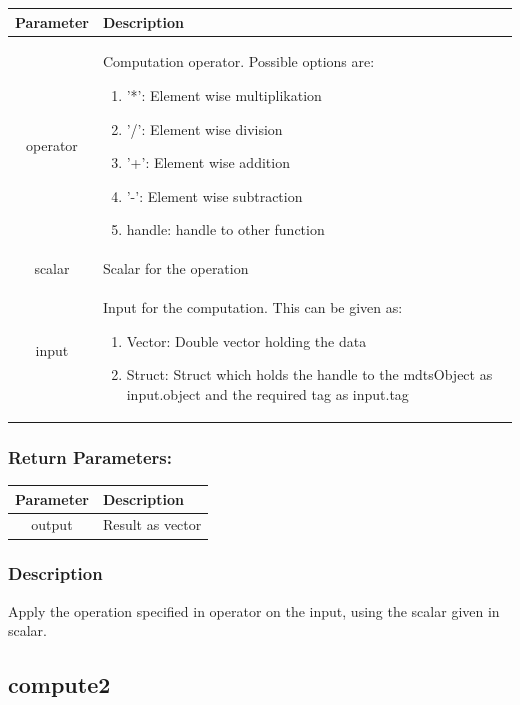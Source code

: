 \documentclass[a4]{scrreprt}
\begin{document}
\begin{longtabu} to \textwidth {|c|X|}
	\hline
	\textbf{Parameter} & \textbf{Description} \\ \hline
	\endhead
	operator & Computation operator. Possible options are:
			   \begin{enumerate}
			   		\item '*': Element wise multiplikation
			   		\item '/': Element wise division
			   		\item '+': Element wise addition
			   		\item '-': Element wise subtraction
			   		\item handle: handle to other function
			   \end{enumerate} \\ \hline
	scalar & Scalar for the operation \\ \hline
	input & Input for the computation. This can be given as:
	\begin{enumerate}
		\item Vector: Double vector holding the data
		\item Struct: Struct which holds the handle to the mdtsObject as input.object and the required tag as input.tag 
	\end{enumerate} \\ \hline
\end{longtabu}

\subsubsection{Return Parameters:}

\begin{longtabu} to \textwidth {|c|X|}
	\hline
	\textbf{Parameter} & \textbf{Description} \\ \hline
	\endhead
	output & Result as vector \\ \hline
\end{longtabu}

\subsubsection{Description}

Apply the operation specified in operator on the input, using the scalar given in scalar.

\subsection{compute2}
\end{document}
